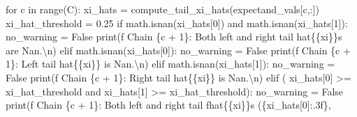 \documentclass[
  letterpaper,
  DIV=11,
  numbers=noendperiod]{scrartcl}
\newenvironment{Shaded}{\begin{snugshade}}{\end{snugshade}}
\newcommand{\BuiltInTok}[1]{\textcolor[rgb]{0.00,0.23,0.31}{#1}}
\newcommand{\CharTok}[1]{\textcolor[rgb]{0.13,0.47,0.30}{#1}}
\newcommand{\ControlFlowTok}[1]{\textcolor[rgb]{0.00,0.23,0.31}{#1}}
\newcommand{\DecValTok}[1]{\textcolor[rgb]{0.68,0.00,0.00}{#1}}
\newcommand{\FloatTok}[1]{\textcolor[rgb]{0.68,0.00,0.00}{#1}}
\newcommand{\KeywordTok}[1]{\textcolor[rgb]{0.00,0.23,0.31}{#1}}
\newcommand{\NormalTok}[1]{\textcolor[rgb]{0.00,0.23,0.31}{#1}}
\newcommand{\OperatorTok}[1]{\textcolor[rgb]{0.37,0.37,0.37}{#1}}
\newcommand{\SpecialCharTok}[1]{\textcolor[rgb]{0.37,0.37,0.37}{#1}}
\newcommand{\SpecialStringTok}[1]{\textcolor[rgb]{0.13,0.47,0.30}{#1}}
\newcommand{\StringTok}[1]{\textcolor[rgb]{0.13,0.47,0.30}{#1}}
\newcommand{\VariableTok}[1]{\textcolor[rgb]{0.07,0.07,0.07}{#1}}
\begin{document}
\begin{Shaded}
\begin{Highlighting}[]
  \ControlFlowTok{for}\NormalTok{ c }\KeywordTok{in} \BuiltInTok{range}\NormalTok{(C):}
\NormalTok{    xi\_hats }\OperatorTok{=}\NormalTok{ compute\_tail\_xi\_hats(expectand\_vals[c,:])}
\NormalTok{    xi\_hat\_threshold }\OperatorTok{=} \FloatTok{0.25}
    \ControlFlowTok{if}\NormalTok{ math.isnan(xi\_hats[}\DecValTok{0}\NormalTok{]) }\KeywordTok{and}\NormalTok{ math.isnan(xi\_hats[}\DecValTok{1}\NormalTok{]):}
\NormalTok{      no\_warning }\OperatorTok{=} \VariableTok{False}
      \BuiltInTok{print}\NormalTok{(}\SpecialStringTok{f\textquotesingle{}  Chain }\SpecialCharTok{\{}\NormalTok{c }\OperatorTok{+} \DecValTok{1}\SpecialCharTok{\}}\SpecialStringTok{: Both left and right tail \textquotesingle{}}
            \StringTok{\textquotesingle{}hat}\SpecialCharTok{\{\{}\StringTok{xi}\SpecialCharTok{\}\}}\StringTok{s are Nan.}\CharTok{\textbackslash{}n}\StringTok{\textquotesingle{}}\NormalTok{)}
    \ControlFlowTok{elif}\NormalTok{ math.isnan(xi\_hats[}\DecValTok{0}\NormalTok{]):}
\NormalTok{      no\_warning }\OperatorTok{=} \VariableTok{False}
      \BuiltInTok{print}\NormalTok{(}\SpecialStringTok{f\textquotesingle{}  Chain }\SpecialCharTok{\{}\NormalTok{c }\OperatorTok{+} \DecValTok{1}\SpecialCharTok{\}}\SpecialStringTok{: Left tail \textquotesingle{}}
            \StringTok{\textquotesingle{}hat}\SpecialCharTok{\{\{}\StringTok{xi}\SpecialCharTok{\}\}}\StringTok{ is Nan.}\CharTok{\textbackslash{}n}\StringTok{\textquotesingle{}}\NormalTok{)}
    \ControlFlowTok{elif}\NormalTok{ math.isnan(xi\_hats[}\DecValTok{1}\NormalTok{]):}
\NormalTok{      no\_warning }\OperatorTok{=} \VariableTok{False}
      \BuiltInTok{print}\NormalTok{(}\SpecialStringTok{f\textquotesingle{}  Chain }\SpecialCharTok{\{}\NormalTok{c }\OperatorTok{+} \DecValTok{1}\SpecialCharTok{\}}\SpecialStringTok{: Right tail \textquotesingle{}}
            \StringTok{\textquotesingle{}hat}\SpecialCharTok{\{\{}\StringTok{xi}\SpecialCharTok{\}\}}\StringTok{ is Nan.}\CharTok{\textbackslash{}n}\StringTok{\textquotesingle{}}\NormalTok{)}
    \ControlFlowTok{elif}\NormalTok{ (    xi\_hats[}\DecValTok{0}\NormalTok{] }\OperatorTok{\textgreater{}=}\NormalTok{ xi\_hat\_threshold}
         \KeywordTok{and}\NormalTok{ xi\_hats[}\DecValTok{1}\NormalTok{] }\OperatorTok{\textgreater{}=}\NormalTok{ xi\_hat\_threshold):}
\NormalTok{      no\_warning }\OperatorTok{=} \VariableTok{False}
      \BuiltInTok{print}\NormalTok{(}\SpecialStringTok{f\textquotesingle{}  Chain }\SpecialCharTok{\{}\NormalTok{c }\OperatorTok{+} \DecValTok{1}\SpecialCharTok{\}}\SpecialStringTok{: Both left and right tail \textquotesingle{}}
            \SpecialStringTok{f\textquotesingle{}hat}\CharTok{\{\{}\SpecialStringTok{xi}\CharTok{\}\}}\SpecialStringTok{s (}\SpecialCharTok{\{}\NormalTok{xi\_hats[}\DecValTok{0}\NormalTok{]}\SpecialCharTok{:.3f\}}\SpecialStringTok{, \textquotesingle{}}

\end{Highlighting}
\end{Shaded}
\end{document}
